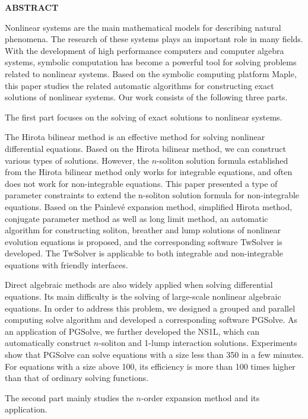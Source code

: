 {}
\centerline{\bfseries ABSTRACT}

\linespread{1.4}
\bigskip

Nonlinear systems are the main mathematical models for describing natural phenomena. The research of these systems plays an important role in many fields. With the development of high performance computers and computer algebra systems, symbolic computation has become a powerful tool for solving problems related to nonlinear systems. Based on the symbolic computing platform Maple, this paper studies the related automatic algorithms for constructing exact solutions of nonlinear systems. Our work consists of the following three parts.

The first part focuses on the solving of exact solutions to nonlinear systems.

The Hirota bilinear method is an effective method for solving nonlinear differential equations. Based on the Hirota bilinear method, we can construct various types of solutions. However, the $n$-soliton solution formula established from the Hirota bilinear method  only works for integrable equations, and often does not work for non-integrable equations. This paper presented a type of parameter constraints to extend the n-soliton solution formula for non-integrable equations. Based on the Painlevé expansion method, simplified Hirota method, conjugate parameter method as well as  long limit method, an automatic algorithm for constructing soliton, breather and lump solutions of nonlinear evolution equations is proposed, and the corresponding software TwSolver is developed. The TwSolver is applicable to both integrable and non-integrable equations with friendly interfaces. 

Direct algebraic methods are also widely applied when solving differential equations. Its main difficulty is the solving of large-scale nonlinear algebraic equations. In order to address this problem, we designed a grouped and parallel computing solve algorithm and developed a corresponding software PGSolve. As an application of PGSolve, we further developed the NS1L,  which can automatically construct $n$-soliton and 1-lump interaction solutions. Experiments show that PGSolve can solve equations with a size less than 350 in a few minutes. For equations with a size above 100, its efficiency is more than 100 times higher than that of ordinary solving functions.

The second part mainly studies the $n$-order expansion method and its application.

